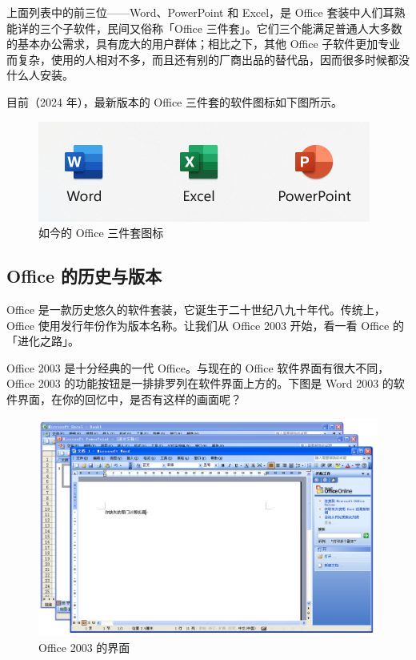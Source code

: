 上面列表中的前三位——Word、PowerPoint 和 Excel，是 Office 套装中人们耳熟能详的三个子软件，民间又俗称「Office 三件套」。它们三个能满足普通人大多数的基本办公需求，具有庞大的用户群体；相比之下，其他 Office 子软件更加专业而复杂，使用的人相对不多，而且还有别的厂商出品的替代品，因而很多时候都没什么人安装。

目前（2024 年），最新版本的 Office 三件套的软件图标如下图所示。

\begin{figure}[htb!]
  \centering
  \includegraphics[width=.5\textwidth]{assets/software/Office_icons.png}
  \caption{如今的 Office 三件套图标}
  \label{fig:Office_icons}
\end{figure}
\vspace*{-1cm}

\subsection{Office 的历史与版本}

Office 是一款历史悠久的软件套装，它诞生于二十世纪八九十年代。传统上，Office 使用发行年份作为版本名称。让我们从 Office 2003 开始，看一看 Office 的「进化之路」。

Office 2003 是十分经典的一代 Office。与现在的 Office 软件界面有很大不同，Office 2003 的功能按钮是一排排罗列在软件界面上方的。下图是 Word 2003 的软件界面，在你的回忆中，是否有这样的画面呢？

\begin{figure}[htb!]
  \centering
  \includegraphics[width=.8\textwidth]{assets/software/Office_2003.png}
  \caption{Office 2003 的界面}
  \label{fig:Office_2003}
\end{figure}

